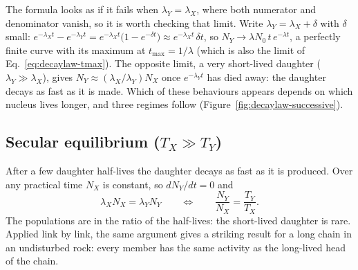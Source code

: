 The formula looks as if it fails when $\lambda_Y=\lambda_X$, where both numerator and denominator
vanish, so it is worth checking that limit. Write $\lambda_Y=\lambda_X+\delta$ with $\delta$ small:
$e^{-\lambda_Xt}-e^{-\lambda_Yt}=e^{-\lambda_Xt}\big(1-e^{-\delta t}\big)\approx e^{-\lambda_Xt}\,\delta t$, so
$N_Y\to\lambda N_0\,t\,e^{-\lambda t}$, a perfectly finite curve with its maximum at $t_{\max}=1/\lambda$
(which is also the limit of Eq.~\eqref{eq:decaylaw-tmax}). The opposite limit, a very short-lived
daughter ($\lambda_Y\gg\lambda_X$), gives $N_Y\approx(\lambda_X/\lambda_Y)N_X$ once $e^{-\lambda_Yt}$ has
died away: the daughter decays as fast as it is made. Which of these behaviours appears depends on which
nucleus lives longer, and three regimes follow (Figure~\ref{fig:decaylaw-successive}).

\begin{figure}[htbp]
\centering
{}
\end{figure}

\subsection{Secular equilibrium (\texorpdfstring{$T_X\gg T_Y$}{TX much longer than TY})}
After a few daughter half-lives the daughter decays as
fast as it is produced. Over any practical time $N_X$ is constant, so $dN_Y/dt=0$ and
\begin{equation}\label{eq:decaylaw-secular}
\lambda_XN_X=\lambda_YN_Y\qquad\Longleftrightarrow\qquad\frac{N_Y}{N_X}=\frac{T_Y}{T_X}.
\end{equation}
The populations are in the ratio of the half-lives: the short-lived daughter is rare. Applied link by
link, the same argument gives a striking result for a long chain in an undisturbed rock: every member
has the same activity as the long-lived head of the chain.

